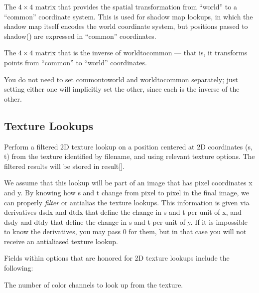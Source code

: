 \apiend

The $4 \times 4$ matrix that provides the spatial transformation
from ``world'' to a ``common'' coordinate system.  This is used for
shadow map lookups, in which the shadow map itself encodes the
world coordinate system, but positions passed to {\cf shadow()} are
expressed in ``common'' coordinates.
\apiend

The $4 \times 4$ matrix that is the inverse of {\cf worldtocommon} ---
that is, it transforms points from ``common'' to ``world'' coordinates.

You do not need to set {\cf commontoworld} and {\cf worldtocommon}
separately; just setting either one will implicitly set the other, since
each is the inverse of the other.
\apiend



\newpage
\subsection{Texture Lookups}
\label{sec:texturesys:api:texture}


Perform a filtered 2D texture lookup on a position centered at 2D
coordinates ({\cf s}, {\cf t}) from the texture identified by
{\cf filename}, and using relevant texture {\cf options}.  The filtered
results will be stored in {\cf result[]}.

We assume that this lookup will be part of an image that has pixel
coordinates {\cf x} and {\cf y}.  By knowing how {\cf s} and {\cf t}
change from pixel to pixel in the final image, we can properly
\emph{filter} or antialias the texture lookups.  This information is
given via derivatives {\cf dsdx} and {\cf dtdx} that define the change
in {\cf s} and {\cf t} per unit of {\cf x}, and {\cf dsdy} and {\cf
  dtdy} that define the change in {\cf s} and {\cf t} per unit of {\cf
  y}.  If it is impossible to know the derivatives, you may pass 0 for
them, but in that case you will not receive an antialiased texture lookup.

Fields within {\cf options} that are honored for 2D texture lookups
include the following:

\vspace{-12pt}
\vspace{10pt}
The number of color channels to look up from the texture.
\apiend

